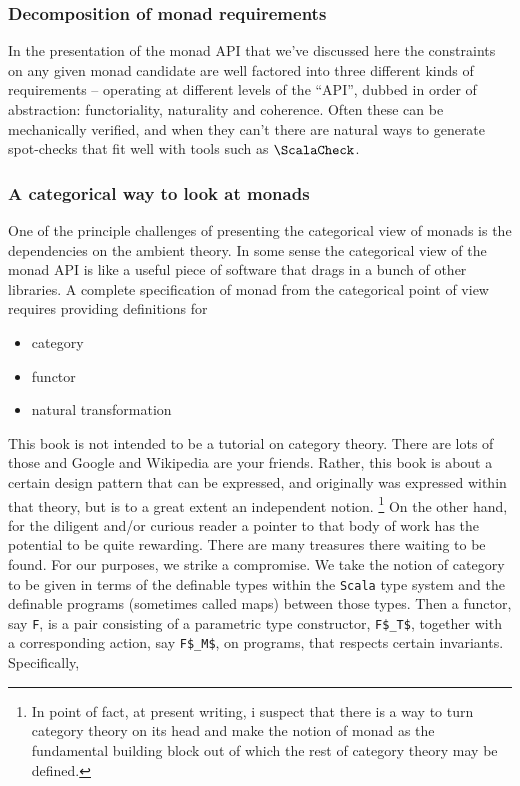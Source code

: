\subsubsection{Decomposition of monad requirements}

In the presentation of the monad API that we've discussed here the
constraints on any given monad candidate are well factored into three
different kinds of requirements -- operating at different levels of
the ``API'', dubbed in order of abstraction: functoriality, naturality
and coherence. Often these can be mechanically verified, and when they
can't there are natural ways to generate spot-checks that fit well
with tools such as $\ScalaCheck$.

\subsubsection{A categorical way to look at monads}

One of the principle challenges of presenting the categorical view of
monads is the dependencies on the ambient theory. In some sense the
categorical view of the monad API is like a useful piece of software
that drags in a bunch of other libraries. A complete specification of
monad from the categorical point of view requires providing
definitions for

\begin{itemize}
  \item category
  \item functor
  \item natural transformation
\end{itemize}

This book is not intended to be a tutorial on category theory. There
are lots of those and Google and Wikipedia are your friends. Rather,
this book is about a certain design pattern that can be expressed, and
originally was expressed within that theory, but is to a great extent
an independent notion. \footnote{In point of fact, at present writing,
  i suspect that there is a way to turn category theory on its head
  and make the notion of monad as the fundamental building block out
  of which the rest of category theory may be defined.} On the other
hand, for the diligent and/or curious reader a pointer to that body of
work has the potential to be quite rewarding. There are many treasures
there waiting to be found. For our purposes, we strike a
compromise. We take the notion of category to be given in terms of the
definable types within the \texttt{Scala} type system and the
definable programs (sometimes called maps) between those types. Then a
functor, say \lstinline[language=Scala,mathescape=true]!F!, is a pair
consisting of a parametric type constructor,
\lstinline[language=Scala,mathescape=true]!F$_T$!, together with a
corresponding action, say
\lstinline[language=Scala,mathescape=true]!F$_M$!, on programs, that
respects certain invariants. Specifically,


